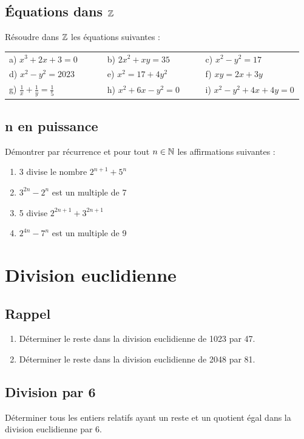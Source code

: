 \documentclass[oneside,12pt]{book}          %
\begin{document}
\subsection{Équations dans ${\mathbb Z}$}
Résoudre dans ${\mathbb Z}$ les équations suivantes :

\begin{tabular}{p{0.33\linewidth} p{0.33\linewidth} p{0.33\linewidth}}
    a) $x^3+2x+3=0$ & b) $2x^2+xy=35$ & c) $x^2-y^2=17$ \\
    d) $x^2-y^2=2023$ & e) $x^2=17+4y^2$ & f) $xy = 2x +3y$ \\
    g) $\frac{1}{x}+\frac{1}{y}=\frac{1}{5}$ & h) $x^2+6x-y^2=0$ & i) $x^2-y^2+4x+4y=0$ \\
\end{tabular}



\subsection{n en puissance}
Démontrer par récurrence et pour tout ${n\in\mathbb N}$ les affirmations suivantes :
\begin{enumerate}
    \item[a)] 3 divise le nombre $2^{n+1}+5^n$
    \item[b)] $3^{2n}-2^n$ est un multiple de 7
    \item[c)] 5 divise $2^{2n+1}+3^{2n+1}$
    \item[d)] $2^{4n}-7^n$ est un multiple de 9
\end{enumerate}



\section{Division euclidienne}

\subsection{Rappel}
\begin{enumerate}
	\item Déterminer le reste dans la division euclidienne de 1023 par 47.
	\item Déterminer le reste dans la division euclidienne de 2048 par 81.
\end{enumerate}



\subsection{Division par 6}
Déterminer tous les entiers relatifs ayant un reste et un quotient égal dans la division euclidienne par 6.
\end{document}

